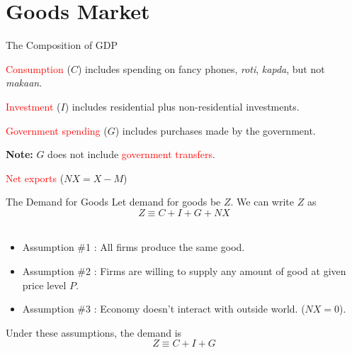 \documentclass[shownotes,11pt, aspectratio=169]{beamer}
\newenvironment{wideitemize}{\itemize\addtolength{\itemsep}{10pt}}{\enditemize}
\begin{document}
\section{Goods Market}
\begin{frame}{The Composition of GDP}
\begin{wideitemize}
\item \textcolor{red}{Consumption} ($C$) includes spending on fancy phones, \textit{roti}, \textit{kapda}, but not \textit{makaan}. 
\item \textcolor{red}{Investment} ($I$) includes residential plus non-residential investments.
\item \textcolor{red}{Government spending} ($G$) includes purchases made by the government.
\item \textbf{Note:} $G$ does not include \textcolor{red}{government transfers}.
\item \textcolor{red}{Net exports} ($ NX = X - M$)
\end{wideitemize}
\end{frame}

\begin{frame}{The Demand for Goods}
Let demand for goods be $Z$. We can write $Z$ as
\[ Z \equiv C + I + G + NX \]
\\
\vspace{3mm}
\pause
\begin{itemize}
\item Assumption \#1 : All firms produce the same good.
\item Assumption \#2 : Firms are willing to supply any amount of good at given price level $P$.
\item Assumption \#3 : Economy doesn't interact with outside world. ($NX = 0$).
\end{itemize}

\vspace{3mm}
Under these assumptions, the demand is 
\[ Z \equiv C + I + G \]
\end{frame}
\end{document}
